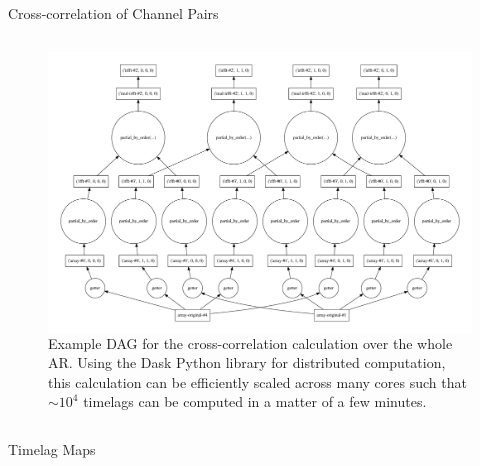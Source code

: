 \documentclass[final]{beamer}
\begin{document}
\begin{frame}
\begin{columns}[T]
\begin{column}{0.49\linewidth}
\begin{block}{Cross-correlation of Channel Pairs}
\begin{columns}[c]
\begin{column}{0.49\columnwidth}
\begin{itemize}
                \end{itemize}
                \begin{figure}
                    \begin{columns}[c]
                        \includegraphics[width=\columnwidth]{figures/timelag_dag.pdf}
                        \caption{Example DAG for the cross-correlation calculation over the whole AR. Using the Dask Python library \citep{dask_development_team_dask:_2016} for distributed computation, this calculation can be efficiently scaled across many cores such that $\sim10^4$ timelags can be computed in a matter of a few minutes.}
                    \end{columns}
                    \label{fig:timelag_dask_dag}
                \end{figure}
            \end{column}
        \end{columns}
    \end{block}
    \begin{block}{Timelag Maps}
        \begin{figure}
\end{figure}
\end{block}
\end{column}
\end{columns}
\end{frame}
\end{document}
